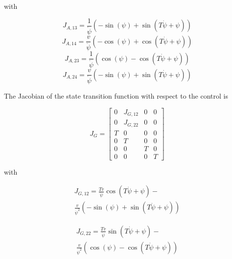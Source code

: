 \documentclass[conference]{IEEEtran}
\begin{document}
with

\begin{equation}J_{A,13}=\frac{1}{\dot\psi} \left(- \sin{\left (\psi \right )} + \sin{\left (T \dot\psi + \psi \right )}\right)\end{equation}
\begin{equation}J_{A,14}=\frac{v}{\dot\psi} \left(- \cos{\left (\psi \right )} + \cos{\left (T \dot\psi + \psi \right )}\right)\end{equation}
\begin{equation}J_{A,23}=\frac{1}{\dot\psi} \left(\cos{\left (\psi \right )} - \cos{\left (T \dot\psi + \psi \right )}\right)\end{equation}
\begin{equation}J_{A,24}=\frac{v}{\dot\psi} \left(- \sin{\left (\psi \right )} + \sin{\left (T \dot\psi + \psi \right )}\right)\end{equation}

The Jacobian of the state transition function with respect to the control is

\begin{equation}J_G=\left[\begin{matrix}0 & J_{G,12} & 0 & 0\\0 & J_{G,22} & 0 & 0\\T & 0 & 0 & 0\\0 & T & 0 & 0\\0 & 0 & T & 0\\0 & 0 & 0 & T\end{matrix}\right]\end{equation}

with

\begin{equation}
	\begin{split}
    	J_{G,12}=\frac{T v}{\dot\psi} \cos{\left (T \dot\psi + \psi \right )} - \\ 		\frac{v}{\dot\psi^{2}} \left(- \sin{\left (\psi \right )} + \sin{\left (T \dot\psi + \psi \right )}\right)
	\end{split}
\end{equation}

\begin{equation}
	\begin{split}
    	J_{G,22}=\frac{T v}{\dot\psi} \sin{\left (T \dot\psi + \psi \right )} - \\ \frac{v}{\dot\psi^{2}} \left(\cos{\left (\psi \right )} - \cos{\left (T \dot\psi + \psi \right )}\right)
    \end{split}
\end{equation}
\end{document}
